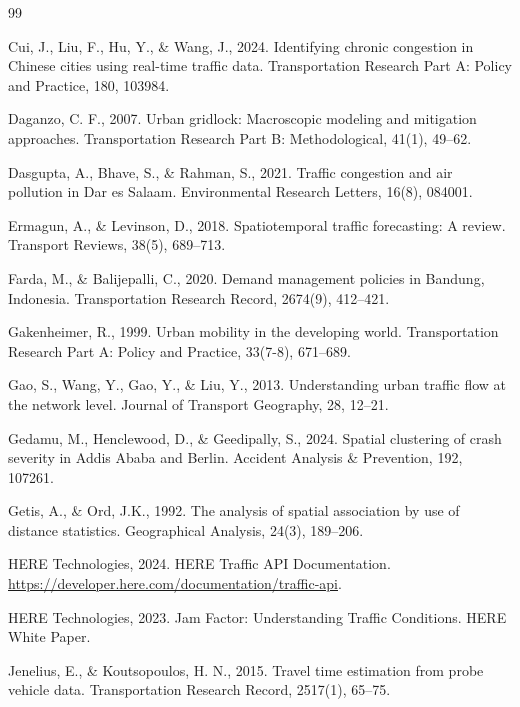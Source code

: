 \documentclass[12pt,a4paper]{article}
\begin{document}
\begin{thebibliography}{99}
\item Cui, J., Liu, F., Hu, Y., \& Wang, J., 2024. Identifying chronic congestion in Chinese cities using real-time traffic data. Transportation Research Part A: Policy and Practice, 180, 103984.

\item Daganzo, C. F., 2007. Urban gridlock: Macroscopic modeling and mitigation approaches. Transportation Research Part B: Methodological, 41(1), 49--62.

\item Dasgupta, A., Bhave, S., \& Rahman, S., 2021. Traffic congestion and air pollution in Dar es Salaam. Environmental Research Letters, 16(8), 084001.

\item Ermagun, A., \& Levinson, D., 2018. Spatiotemporal traffic forecasting: A review. Transport Reviews, 38(5), 689--713.

\item Farda, M., \& Balijepalli, C., 2020. Demand management policies in Bandung, Indonesia. Transportation Research Record, 2674(9), 412--421.

\item Gakenheimer, R., 1999. Urban mobility in the developing world. Transportation Research Part A: Policy and Practice, 33(7-8), 671--689.

\item Gao, S., Wang, Y., Gao, Y., \& Liu, Y., 2013. Understanding urban traffic flow at the network level. Journal of Transport Geography, 28, 12--21.

\item Gedamu, M., Henclewood, D., \& Geedipally, S., 2024. Spatial clustering of crash severity in Addis Ababa and Berlin. Accident Analysis \& Prevention, 192, 107261.

\item Getis, A., \& Ord, J.K., 1992. The analysis of spatial association by use of distance statistics. Geographical Analysis, 24(3), 189--206.

\item HERE Technologies, 2024. HERE Traffic API Documentation. \url{https://developer.here.com/documentation/traffic-api}.

\item HERE Technologies, 2023. Jam Factor: Understanding Traffic Conditions. HERE White Paper.

\item Jenelius, E., \& Koutsopoulos, H. N., 2015. Travel time estimation from probe vehicle data. Transportation Research Record, 2517(1), 65--75.


\end{thebibliography}
\end{document}
